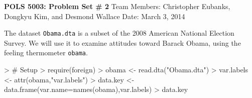 \documentclass[12pt]{article}
\begin{document}


\pagestyle{empty}

\begin{center}
{\Large \textbf{POLS 5003: Problem Set \# 2}}
\linebreak
Team Members: Christopher Eubanks, Dongkyu Kim, and Desmond Wallace
\linebreak
Date: March 3, 2014
\end{center}

The dataset \texttt{Obama.dta} is a subset of the 2008 American National Election Survey.  We will use it to examine attitudes toward Barack Obama, using the feeling thermometer \texttt{obama}.

\begin{Schunk}
\begin{Sinput}
> # Setup
> require(foreign)
> obama <- read.dta("Obama.dta")
> var.labels <- attr(obama,"var.labels")
> data.key <- data.frame(var.name=names(obama),var.labels)
> data.key
\end{Sinput}
\end{Schunk}
\end{document}
